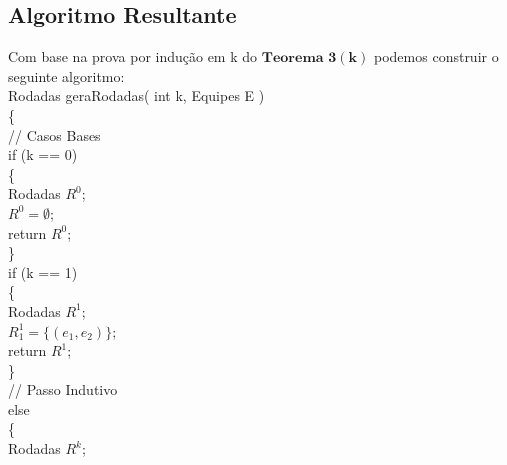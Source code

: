 \documentclass[twoside]{article}
\begin{document}
\begin{multicols}{2}
\subsection{ Algoritmo Resultante }
\indent Com base na prova por indução em k do $\mathbf{Teorema}$ $\mathbf{3}$$\mathbf{(k)}$ podemos construir o seguinte algoritmo:\\
\noindent
{\color[rgb]{0,0,1} Rodadas} {\color[rgb]{0,0.5,0.5} geraRodadas}( {\color[rgb]{0,0,1} int} k, {\color[rgb]{0,0,1} Equipes} E )\\
\{\\
\hspace*{5mm} {\color[rgb]{0,0.5,0}// Casos Bases}\\
\hspace*{5mm} {\color[rgb]{0.7,0.3,0} if} (k == 0)\\
\hspace*{5mm} \{\\
\hspace*{10mm} {\color[rgb]{0,0,1} Rodadas} $R^{0}$;\\
\hspace*{10mm} $R^{0} = \emptyset$;\\
\hspace*{10mm} {\color[rgb]{0.5,0,1} return}  $R^{0}$;\\
\hspace*{5mm} \}\\
\hspace*{5mm} {\color[rgb]{0.7,0.3,0} if} (k == 1)\\
\hspace*{5mm} \{\\
\hspace*{10mm} {\color[rgb]{0,0,1} Rodadas} $R^{1}$;\\
\hspace*{10mm} $R_1^{1} = \{(e_1,e_2)\}$;\\
\hspace*{10mm} {\color[rgb]{0.5,0,1} return} $R^{1}$;\\
\hspace*{5mm} \}\\
\hspace*{5mm} {\color[rgb]{0,0.5,0}// Passo Indutivo}\\
\hspace*{5mm} {\color[rgb]{0.7,0.3,0} else}\\
\hspace*{5mm} \{\\
\hspace*{10mm} {\color[rgb]{0,0,1} Rodadas} $R^{k}$;\\
$$
\end{multicols}
\end{document}
